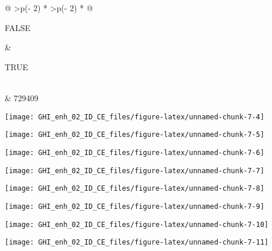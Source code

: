 \documentclass[
  10pt,
  a4paper,oneside]{article}
\begin{document}
\begin{longtable}[]{@{}
  >{\raggedleft\arraybackslash}p{(\columnwidth - 2\tabcolsep) * }
  >{\raggedleft\arraybackslash}p{(\columnwidth - 2\tabcolsep) * }@{}}
\toprule\noalign{}
\begin{minipage}[b]{\linewidth}\raggedleft
FALSE
\end{minipage} & \begin{minipage}[b]{\linewidth}\raggedleft
TRUE
\end{minipage} \\
\midrule\noalign{}
\endhead
\bottomrule\noalign{}
 & 729409 \\
\end{longtable}

\begin{center}\texttt{[image: GHI\_enh\_02\_ID\_CE\_files/figure-latex/unnamed-chunk-7-4]} \end{center}

\begin{center}\texttt{[image: GHI\_enh\_02\_ID\_CE\_files/figure-latex/unnamed-chunk-7-5]} \end{center}

\begin{center}\texttt{[image: GHI\_enh\_02\_ID\_CE\_files/figure-latex/unnamed-chunk-7-6]} \end{center}

\begin{center}\texttt{[image: GHI\_enh\_02\_ID\_CE\_files/figure-latex/unnamed-chunk-7-7]} \end{center}

\begin{center}\texttt{[image: GHI\_enh\_02\_ID\_CE\_files/figure-latex/unnamed-chunk-7-8]} \end{center}

\begin{center}\texttt{[image: GHI\_enh\_02\_ID\_CE\_files/figure-latex/unnamed-chunk-7-9]} \end{center}

\begin{center}\texttt{[image: GHI\_enh\_02\_ID\_CE\_files/figure-latex/unnamed-chunk-7-10]} \end{center}

\begin{center}\texttt{[image: GHI\_enh\_02\_ID\_CE\_files/figure-latex/unnamed-chunk-7-11]} \end{center}
\end{document}
